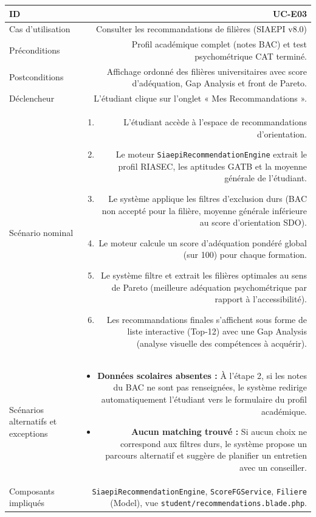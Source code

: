 \noindent
{}
\begin{tabularx}{\linewidth}{|L|R|}
\hline
{}ID & UC-E03 \\
\hline
Cas d'utilisation & Consulter les recommandations de filières (SIAEPI v8.0) \\
\hline
{}Préconditions & Profil académique complet (notes BAC) et test psychométrique CAT terminé. \\
\hline
Postconditions & Affichage ordonné des filières universitaires avec score d'adéquation, Gap Analysis et front de Pareto. \\
\hline
{}Déclencheur & L'étudiant clique sur l'onglet « Mes Recommandations ». \\
\hline
Scénario nominal &
\begin{enumerate}[nosep,leftmargin=*]
  \item L'étudiant accède à l'espace de recommandations d'orientation.
  \item Le moteur \texttt{SiaepiRecommendationEngine} extrait le profil RIASEC, les aptitudes GATB et la moyenne générale de l'étudiant.
  \item Le système applique les filtres d'exclusion durs (BAC non accepté pour la filière, moyenne générale inférieure au score d'orientation SDO).
  \item Le moteur calcule un score d'adéquation pondéré global (sur 100) pour chaque formation.
  \item Le système filtre et extrait les filières optimales au sens de Pareto (meilleure adéquation psychométrique par rapport à l'accessibilité).
  \item Les recommandations finales s'affichent sous forme de liste interactive (Top-12) avec une Gap Analysis (analyse visuelle des compétences à acquérir).
\end{enumerate} \\
\hline
{}Scénarios alternatifs et exceptions &
\begin{itemize}[nosep,leftmargin=*]
  \item \textbf{Données scolaires absentes :} À l'étape 2, si les notes du BAC ne sont pas renseignées, le système redirige automatiquement l'étudiant vers le formulaire du profil académique.
  \item \textbf{Aucun matching trouvé :} Si aucun choix ne correspond aux filtres durs, le système propose un parcours alternatif et suggère de planifier un entretien avec un conseiller.
\end{itemize} \\
\hline
Composants impliqués & \texttt{SiaepiRecommendationEngine}, \texttt{ScoreFGService}, \texttt{Filiere} (Model), vue \texttt{student/recommendations.blade.php}. \\
\hline
\end{tabularx}

